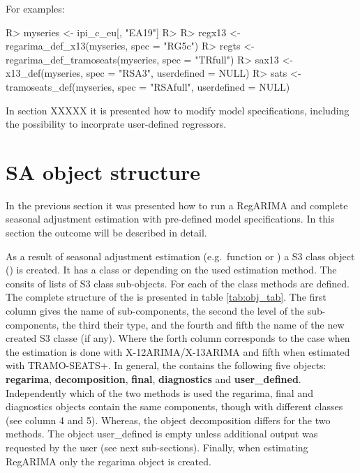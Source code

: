 \documentclass[article]{jss}
\begin{document}
For examples:

\begin{CodeChunk}

\begin{CodeInput}
R> myseries <- ipi_c_eu[, "EA19"]
R> 
R> regx13 <- regarima_def_x13(myseries, spec = "RG5c")
R> regts <- regarima_def_tramoseats(myseries, spec = "TRfull")
R> sax13 <- x13_def(myseries, spec = "RSA3", userdefined = NULL)
R> sats <- tramoseats_def(myseries, spec = "RSAfull", userdefined = NULL)
\end{CodeInput}
\end{CodeChunk}

In section XXXXX it is presented how to modify model specifications,
including the possibility to incorprate user-defined regressors.

\hypertarget{sa-object-structure}{%
\section{SA object structure}\label{sa-object-structure}}

In the previous section it was presented how to run a RegARIMA and
complete seasonal adjustment estimation with pre-defined model
specifications. In this section the outcome will be described in detail.

As a result of seasonal adjustment estimation (e.g.~function
 or ) a S3 class object
() is created. It has a class  or
 depending on the used estimation method.
The  consits of lists of S3 class sub-objects. For each
of the class  methods are defined. The complete
structure of the  is presented in table
\ref{tab:obj_tab}. The first column gives the name of 
sub-components, the second the level of the sub-components, the third
their type, and the fourth and fifth the name of the new created S3
classe (if any). Where the forth column corresponds to the case when the
estimation is done with X-12ARIMA/X-13ARIMA and fifth when estimated
with TRAMO-SEATS+. In general, the  contains the
following five objects: \textbf{regarima}, \textbf{decomposition},
\textbf{final}, \textbf{diagnostics} and \textbf{user\_defined}.
Independently which of the two methods is used the regarima, final and
diagnostics objects contain the same components, though with different
classes (see column 4 and 5). Whereas, the object decomposition differs
for the two methods. The object user\_defined is empty unless additional
output was requested by the user (see next sub-sections). Finally, when
estimating RegARIMA only the regarima object is created.
\end{document}
